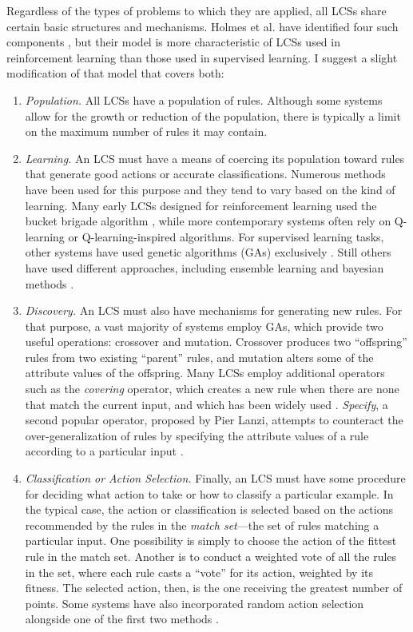 \documentclass[12pt,twoside]{article}
\begin{document}
Regardless of the types of problems to which they are applied, all LCSs share certain basic structures and mechanisms. Holmes et al. have identified four such components  \cite{holmes_learning_2002}, but their model is more characteristic of LCSs used in reinforcement learning than those used in supervised learning. I suggest a slight modification of that model that covers both:
\begin{enumerate}
\item \emph{Population.} All LCSs have a population of rules. Although some systems allow for the growth or reduction of the population, there is typically a limit on the maximum number of rules it may contain.
\item \emph{Learning.} An LCS must have a means of coercing its population toward rules that generate good actions or accurate classifications. Numerous methods have been used for this purpose and they tend to vary based on the kind of learning. Many early LCSs designed for reinforcement learning used the bucket brigade algorithm \cite{holland_properties_1985}, while more contemporary systems often rely on Q-learning \cite{c._j._c._h._learning_1989, orriols-puig_fuzzy-ucs:_2009} or Q-learning-inspired algorithms. For supervised learning tasks, other systems have used genetic algorithms (GAs) exclusively \cite{llora_towards_2007}. Still others have used different approaches, including ensemble learning \cite{gao_learning_2005} and bayesian methods \cite{hai_h._dam_bcs:_2006}.
\item \emph{Discovery.} An LCS must also have mechanisms for generating new rules. For that purpose, a vast majority of systems employ GAs, which provide two useful operations: crossover and mutation. Crossover produces two ``offspring'' rules from two existing ``parent'' rules, and mutation alters some of the attribute values of the offspring. Many LCSs employ additional operators such as the \emph{covering} operator, which creates a new rule when there are none that match the current input, and which has been widely used \cite{orriols-puig_fuzzy-ucs:_2009, wilson_classifier_1995, bernado-mansilla_accuracy-based_2003}. \emph{Specify}, a second popular operator, proposed by Pier Lanzi,  attempts to counteract the over-generalization of rules by specifying the attribute values of a rule according to a particular input \cite{lanzi_study_1997}. 
\item \emph{Classification or Action Selection.} Finally, an LCS must have some procedure for deciding what action to take or how to classify a particular example. In the typical case, the action or classification is selected based on the actions recommended by the rules in the \emph{match set}---the set of rules matching a particular input. One possibility is simply to choose the action of the fittest rule in the match set. Another is to conduct a weighted vote of all the rules in the set, where each rule casts a ``vote'' for its action, weighted by its fitness. The selected action, then, is the one receiving the greatest number of points. Some systems have also incorporated random action selection alongside one of the first two methods \cite{wilson_classifier_1995}.
\end{enumerate}
\end{document}
